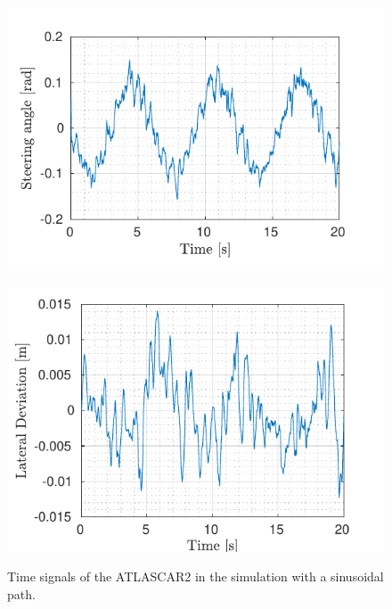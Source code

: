 \begin{figure}[!h]
\begin{minipage}[t]{0.49\textwidth}
		\includegraphics[width=\textwidth]{../../MATLAB/lane_following/figure/SteeringAngleVsTime.pdf}
		\label{fig:steering_laneFollowing}
	\end{minipage}
	\begin{minipage}[t]{0.49\textwidth}
		\includegraphics[width=\textwidth]{../../MATLAB/lane_following/figure/LateralDeviationVsTime.pdf}
		\label{fig:lateral_deviation_laneFollowing}
	\end{minipage}
	\caption{Time signals of the ATLASCAR2 in the simulation with a sinusoidal path.}
	\label{fig:laneFollowing_signals}
\end{figure}


